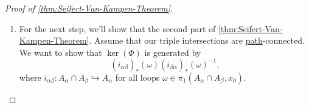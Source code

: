 \begin{proof}[Proof of \autoref{thm:Seifert-Van-Kampen-Theorem}]
\begin{enumerate}
		      Specifically, since
		      \begin{itemize}
			      \item \(A_{\alpha }\) is open for all \(\alpha \)
			      \item \(I\) is compact,
		      \end{itemize}
		      then for all \(i\), we choose a \hyperref[def:path]{path} \(h_{i}\) from \(x_0\) to \(\gamma (s_{i})\) in \(A_{\sigma _{i-1}}\cap A_{\alpha _{i}}\), using \hyperref[def:path]{path}-connectedness of the pairwise intersections. Now, take \(\gamma \) and write it as
		      \[
			      \gamma = (\gamma _1\cdot \overline{h} _1)\cdot (\overline{h} _1\cdot \gamma _2)\cdot \dots \cdot (\gamma_{n-1}\cdot \overline{h} _{n-1}) \cdot (h_{n-1}\cdot \gamma _n).
		      \]
		      Observe that each of these \hyperref[def:path]{paths} is fully contained in \(A_{\alpha _{i}}\), so this implies that \(\gamma \in \im  (\Phi )\), therefore \(\Phi \) is surjective.
		\item For the next step, we'll show that the second part of \autoref{thm:Seifert-Van-Kampen-Theorem}. Assume that our triple intersections are \hyperref[def:path]{path}-connected. We want to show that \(\ker (\Phi ) \) is generated by
		      \[
			      (i_{\alpha \beta })_\ast (\omega )(i_{\beta \alpha })_\ast (\omega )^{-1},
		      \]
		      where \(i_{\alpha \beta }\colon A_\alpha \cap A_\beta \hookrightarrow A_\alpha\) for all loops \(\omega \in\pi_1(A_\alpha \cap A_\beta , x_0)\).


\end{enumerate}
\end{proof}
